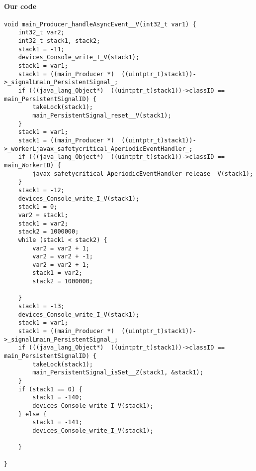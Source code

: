 \paragraph{Our code}\hfill
\begin{lstlisting}[firstnumber=1525]
void main_Producer_handleAsyncEvent__V(int32_t var1) {
	int32_t var2;
	int32_t stack1, stack2;
	stack1 = -11;
	devices_Console_write_I_V(stack1);
	stack1 = var1;
	stack1 = ((main_Producer *)  ((uintptr_t)stack1))->_signalLmain_PersistentSignal_;
	if (((java_lang_Object*)  ((uintptr_t)stack1))->classID == main_PersistentSignalID) {
		takeLock(stack1);
		main_PersistentSignal_reset__V(stack1);
	}
	stack1 = var1;
	stack1 = ((main_Producer *)  ((uintptr_t)stack1))->_workerLjavax_safetycritical_AperiodicEventHandler_;
	if (((java_lang_Object*)  ((uintptr_t)stack1))->classID == main_WorkerID) {
		javax_safetycritical_AperiodicEventHandler_release__V(stack1);
	}
	stack1 = -12;
	devices_Console_write_I_V(stack1);
	stack1 = 0;
	var2 = stack1;
	stack1 = var2;
	stack2 = 1000000;
	while (stack1 < stack2) {
		var2 = var2 + 1;
		var2 = var2 + -1;
		var2 = var2 + 1;
		stack1 = var2;
		stack2 = 1000000;

	}
	stack1 = -13;
	devices_Console_write_I_V(stack1);
	stack1 = var1;
	stack1 = ((main_Producer *)  ((uintptr_t)stack1))->_signalLmain_PersistentSignal_;
	if (((java_lang_Object*)  ((uintptr_t)stack1))->classID == main_PersistentSignalID) {
		takeLock(stack1);
		main_PersistentSignal_isSet__Z(stack1, &stack1);
	}
	if (stack1 == 0) {
		stack1 = -140;
		devices_Console_write_I_V(stack1);
	} else {
		stack1 = -141;
		devices_Console_write_I_V(stack1);

	}

}
\end{lstlisting}

